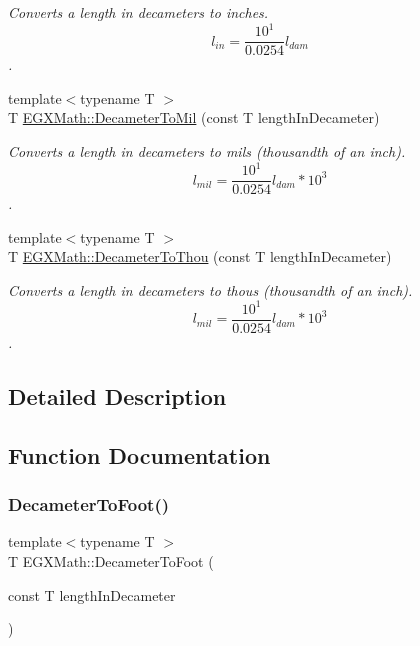 \begin{DoxyCompactItemize}
\begin{DoxyCompactList}\small\item\em Converts a length in decameters to inches. \[ l_{in}= \frac{10^{1}}{0.0254} l_{dam} \]. \end{DoxyCompactList}\item 
{\footnotesize template$<$typename T $>$ }\\T \mbox{\hyperlink{group___e_g_x_math-_conversions-_length_conversions-_decameter-_imperial_gaee77251b6c2f2e8e0feae0032e80e0c3}{E\+G\+X\+Math\+::\+Decameter\+To\+Mil}} (const T length\+In\+Decameter)
\begin{DoxyCompactList}\small\item\em Converts a length in decameters to mils (thousandth of an inch). \[ l_{mil}= \frac{10^{1}}{0.0254} l_{dam} * 10^{3} \]. \end{DoxyCompactList}\item 
{\footnotesize template$<$typename T $>$ }\\T \mbox{\hyperlink{group___e_g_x_math-_conversions-_length_conversions-_decameter-_imperial_ga4f21f4b1df62d1d63f46849c4f38d56b}{E\+G\+X\+Math\+::\+Decameter\+To\+Thou}} (const T length\+In\+Decameter)
\begin{DoxyCompactList}\small\item\em Converts a length in decameters to thous (thousandth of an inch). \[ l_{mil}= \frac{10^{1}}{0.0254} l_{dam} * 10^{3} \]. \end{DoxyCompactList}\end{DoxyCompactItemize}


\subsection{Detailed Description}


\subsection{Function Documentation}
\mbox{\label{group___e_g_x_math-_conversions-_length_conversions-_decameter-_imperial_gad2829e03e1755db4f7f9b21070ecaef6}} 
\subsubsection{\texorpdfstring{Decameter\+To\+Foot()}{DecameterToFoot()}}
{\footnotesize\ttfamily template$<$typename T $>$ \\
T E\+G\+X\+Math\+::\+Decameter\+To\+Foot (\begin{DoxyParamCaption}\item[{const T}]{length\+In\+Decameter }\end{DoxyParamCaption})}



